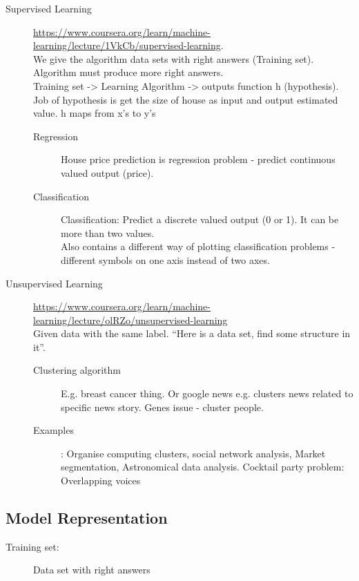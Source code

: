 \documentclass[a4paper]{report}
\begin{document}
\begin{description}
  \item[Supervised Learning] \url{https://www.coursera.org/learn/machine-learning/lecture/1VkCb/supervised-learning}. \\
  We give the algorithm data sets with right answers (Training set). Algorithm must produce more right answers.\\
  Training set -> Learning Algorithm ->  outputs function h (hypothesis). Job of hypothesis is get the size of house as input and output estimated value.
  h maps from x's to y's
  \begin{description}
    \item[Regression] House price prediction is regression problem - predict continuous valued output (price).
    \item[Classification] Classification: Predict a discrete valued output (0 or 1). It can be more than two values. \\
    Also contains a different way of plotting classification problems - different symbols on one axis instead of two axes.
  \end{description}  
  \item[Unsupervised Learning] \url{https://www.coursera.org/learn/machine-learning/lecture/olRZo/unsupervised-learning} \\
  Given data with the same label. ``Here is a data set, find some structure in it''.
  \begin{description}
    \item[Clustering algorithm] E.g. breast cancer thing. Or google news e.g. clusters news related to specific news story. Genes issue - cluster people.
    \item[Examples]: Organise computing clusters, social network analysis, Market segmentation, Astronomical data analysis. Cocktail party problem: Overlapping voices
  \end{description}
\end{description}


\subsection{Model Representation}
\label{sec:model_rep}
\begin{description}
  \item[Training set:] Data set with right answers
\end{description}
\end{document}

